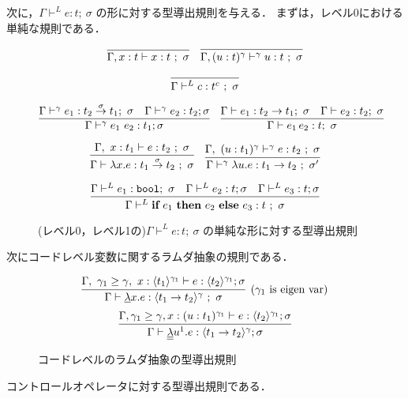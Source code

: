 \documentclass[dvipdfmx]{jsarticle}
\begin{document}
次に，$\Gamma \vdash^{L} e : t ;~\sigma$ の形に対する型導出規則を与える．
まずは，レベル0における単純な規則である．

\begin{figure}[H]
  \centering
  \[
    \infer
    {\Gamma, x : t \vdash x : t ~;~ \sigma}
    {}
    \quad
    \infer
    {\Gamma, (u : t)^\gamma \vdash^\gamma u : t ~;~ \sigma}
    {}
  \]

  \[
    \infer
    {\Gamma \vdash^{L} c : t^c ~;~\sigma}
    {}
  \]

  \[
    \infer
    {\Gamma \vdash^{\gamma} e_1~ e_2 : t_1 ; \sigma}
    {\Gamma \vdash^{\gamma} e_1 : \funT{t_2}{t_1}{\sigma};~ \sigma
      & \Gamma \vdash^{\gamma} e_2 : t_2  ; \sigma
    }
    \quad
    \infer
    {\Gamma \vdash e_1 \, e_2 : t;~\sigma}
    {\Gamma \vdash e_1 : t_2 \to t_1;~\sigma
      &\Gamma \vdash e_2 : t_2;~\sigma
    }
  \]

  \[
    \infer
    {\Gamma \vdash \fun{x}{e} : \funT{t_1}{t_2}{\sigma} ~;~\sigma}
    {\Gamma,~x : t_1 \vdash e : t_2 ~;~ \sigma}
    \quad
    \infer
    {\Gamma \vdash^\gamma \fun{u}{e} : \funT{t_1}{t_2}{} ~;~\sigma'}
    {\Gamma,~(u : t_1)^\gamma \vdash^\gamma e : t_2 ~;~ \sigma}
  \]

  \[
    \infer
    {\Gamma \vdash^{L} \ift{e_1}{e_2}{e_3} : t ~;~ \sigma}
    {\Gamma \vdash^{L} e_1 : \boolT ;~ \sigma
      & \Gamma \vdash^{L} e_2 : t ; \sigma
      & \Gamma \vdash^{L} e_3 : t ; \sigma}
  \]
  \caption{(レベル0，レベル1の)$\Gamma \vdash^{L} e : t ;~\sigma$ の単純な形に対する型導出規則}
  \label{fig:gvs_rule}
\end{figure}


次にコードレベル変数に関するラムダ抽象の規則である．

\begin{figure}[H]
  \centering
  \[
    \infer[(\gamma_1~\text{is eigen var})]
    {\Gamma \vdash \cfun{x}{e} : \codeT{t_1\to t_2}{\gamma} ~;~ \sigma}
    {\Gamma,~\gamma_1 \ord \gamma,~x:\codeT{t_1}{\gamma_1} \vdash e
      : \codeT{t_2}{\gamma_1}; \sigma}
  \]
  \[
    \infer
    {\Gamma \vdash \ccfun{u^1}{e} : \codeT{t_1 \to t_2}{\gamma} ; \sigma}
    {\Gamma, \gamma_1 \ord \gamma, x : (u : t_1)^{\gamma_1} \vdash e : \codeT{t_2}{\gamma_1} ; \sigma}
  \]
  \caption{コードレベルのラムダ抽象の型導出規則}
  \label{fig:code_abs_type_rule}
\end{figure}


コントロールオペレータに対する型導出規則である．
\end{document}
